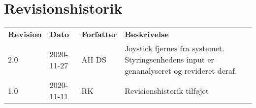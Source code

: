 \chapter{Revisionshistorik}

\begin{table}[!h]
    \centering
    \begin{tabular}{lllp{5cm}}
        \textbf{Revision} & \textbf{Dato} & \textbf{Forfatter} & \textbf{Beskrivelse} \\
        2.0               & 2020-11-27    & AH DS           & Joystick fjernes fra systemet. Styringsenhedens input er genanalyseret og revideret deraf. \\
        1.0               & 2020-11-11    & RK                 & Revisionshistorik tilføjet\\
    \end{tabular}
\end{table}
